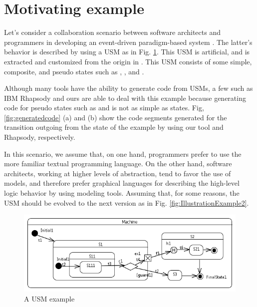 \section{Motivating example}
\label{sec:motivation}
Let's consider a collaboration scenario between software architects and programmers in developing an event-driven paradigm-based system . The latter's behavior is described by using a USM as in Fig. \ref{fig:IllustrationExample1}.
This USM is artificial, and is extracted and customized from the origin in \cite{shuang_formalizing}.
This USM consists of some simple, composite, and pseudo states such as , , and .

Although many tools have the ability to generate code from USMs, a few such as IBM Rhapsody \cite{ibm_rhapsody} and ours are able to deal with this example because generating code for pseudo states such as  and  is not as simple as states.
Fig, \ref{fig:generatedcode} (a) and (b) show the code segments generated for the transition outgoing from the state  of the example by using our tool and Rhapsody, respectively.

In this scenario, we assume that, on one hand, programmers prefer to
use the more familiar textual programming language. 
On the other hand, software architects, working at higher levels
of abstraction, tend to favor the use of models, and therefore
prefer graphical languages for describing the high-level logic behavior by using modeling tools.
Assuming that, for some reasons, the USM should be evolved to the next version as in Fig. \ref{fig:IllustrationExample2}.

\begin{figure}
	\centering
	\includegraphics[clip, trim=0.2cm 0.2cm 0.2cm 0.2cm, width=1.0\columnwidth]{figures/IllustrationExample1.png}
	\caption{A USM example} 
	\label{fig:IllustrationExample1}
\end{figure}

